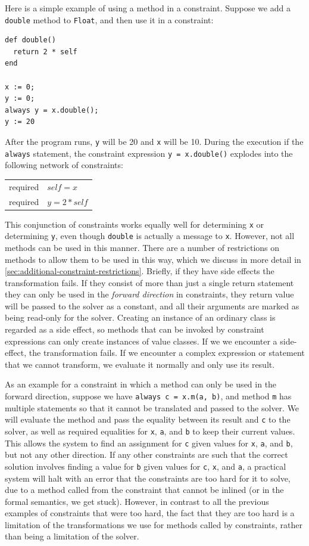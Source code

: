 Here is a simple example of using a method in a constraint. Suppose we
add a \verb|double| method to \verb|Float|, and then use it in a
constraint:

\begin{lstlisting}
def double()
  return 2 * self
end

x := 0;
y := 0;
always y = x.double();
y := 20
\end{lstlisting}

After the program runs, \verb|y| will be 20 and \verb|x| will be 10.  During the
execution if the \verb|always| statement, the constraint expression
\verb|y = x.double()| explodes into the following network of constraints:
\begin{center}
  \begin{tabular}{rl}
    required & $self = x$\\
    required & $y = 2 * self$
  \end{tabular}
\end{center}
This conjunction of constraints works equally well for determining
\verb|x| or determining \verb|y|, even though \verb|double| is
actually a message to \verb|x|.
However, not all methods can be used in this manner. There are a
number of restrictions on methods to allow them to be used in this
way, which we discuss in more detail in
\autoref{sec:additional-constraint-restrictions}. Briefly, if they
have side effects the transformation fails. If they consist of more
than just a single return statement they can only be used in the
\emph{forward direction} in constraints, \ie they return value will be
passed to the solver as a constant, and all their arguments are marked
as being read-only for the solver. Creating an instance of an ordinary
class is regarded as a side effect, so methods that can be invoked by
constraint expressions can only create instances of value classes. If
we we encounter a side-effect, the transformation fails. If we
encounter a complex expression or statement that we cannot transform,
we evaluate it normally and only use its result.

As an example for a constraint in which a method can only be used in
the forward direction, suppose we have \verb|always c = x.m(a, b)|,
and method \verb|m| has multiple statements so that it cannot be
translated and passed to the solver. We will evaluate the method and
pass the equality between its result and \verb!c! to the solver, as
well as required equalities for \verb!x!, \verb!a!, and \verb!b! to
keep their current values. This allows the system to find an
assignment for \verb|c| given values for \verb|x|, \verb|a|, and
\verb|b|, but not any other direction. If any other constraints are
such that the correct solution involves finding a value for \verb|b|
given values for \verb|c|, \verb|x|, and \verb|a|, a practical system
will halt with an error that the constraints are too hard for it to
solve, due to a method called from the constraint that cannot be
inlined (or in the formal semantics, we get stuck).  However, in
contrast to all the previous examples of constraints that were too
hard, the fact that they are too hard is a limitation of the
transformations we use for methods called by constraints, rather than
being a limitation of the solver.

